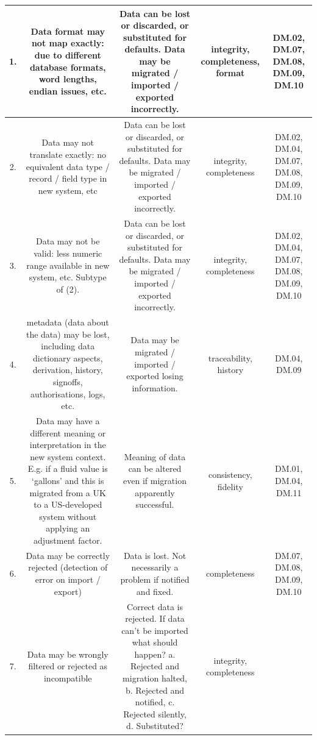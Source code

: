 \begin{longtable}{|C{}|C{}|C{}|C{}|C{}|}
1.&
Data format may not map exactly: due to different \gls{database} formats, word lengths, endian issues, etc.&
Data can be lost or discarded, or substituted for defaults. Data may be migrated / imported / exported incorrectly.&
\Gls{integrity}, \gls{completeness}, \gls{format}&
DM.02, DM.07, DM.08, DM.09, DM.10\\\hline
%
2.&
Data may not translate exactly: no equivalent data type / record / field type in new system, etc&
Data can be lost or discarded, or substituted for defaults. Data may be migrated / imported / exported incorrectly.&
\Gls{integrity}, \gls{completeness}&
DM.02, DM.04, DM.07, DM.08, DM.09, DM.10\\\hline
%
3.&
Data may not be valid: less numeric range available in new system, etc. Subtype of (2).&
Data can be lost or discarded, or substituted for defaults. Data may be migrated / imported / exported incorrectly.&
\Gls{integrity}, \gls{completeness}&
DM.02, DM.04, DM.07, DM.08, DM.09, DM.10\\\hline
%
4.&
\Gls{metadata} (data about the data) may be lost, including \gls{data dictionary} aspects, derivation, history, signoffs, authorisations,
logs, etc.&
Data may be migrated / imported / exported losing \gls{information}.&
\Gls{traceability}, \gls{history}&
DM.04, DM.09\\\hline
%
5.&
Data may have a different meaning or interpretation in the new system context.
E.g. if a fluid value is ‘gallons’ and this is migrated from a UK to a US-developed system without applying an adjustment factor.&
Meaning of data can be altered even if migration apparently successful.&
\Gls{consistency}, \gls{fidelity} &
DM.01, DM.04, DM.11\\\hline
%
6.
&
Data may be correctly rejected (detection of error on import / export)&
Data is lost. Not necessarily a problem if notified and fixed.&
\Gls{completeness}&
DM.07, DM.08, DM.09, DM.10\\\hline
%
7.
&
Data may be wrongly filtered or rejected as incompatible&
Correct data is rejected. If data can’t be imported what should happen? a. Rejected and migration halted,
b. Rejected and notified, c. Rejected silently, d. Substituted?&
\Gls{integrity}, \gls{completeness}&

\end{longtable}
